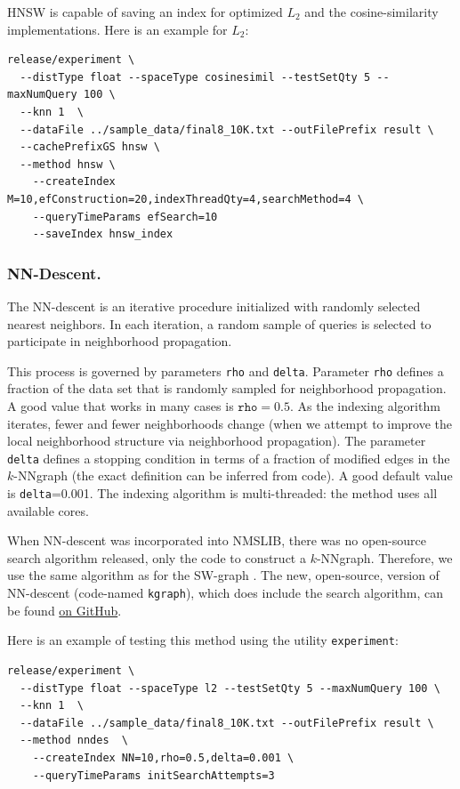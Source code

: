 \documentclass[runningheads,a4paper]{llncs}
\newcommand{\ttt}[1]{\texttt{#1}}
\newcommand{\knnns}{$k$-NN}
\begin{document}
HNSW is capable of saving an index for optimized $L_2$ and the cosine-similarity implementations. 
Here is an example for $L_2$:
{
\footnotesize
\begin{verbatim}
release/experiment \
  --distType float --spaceType cosinesimil --testSetQty 5 --maxNumQuery 100 \
  --knn 1  \
  --dataFile ../sample_data/final8_10K.txt --outFilePrefix result \
  --cachePrefixGS hnsw \
  --method hnsw \
    --createIndex M=10,efConstruction=20,indexThreadQty=4,searchMethod=4 \
    --queryTimeParams efSearch=10 
    --saveIndex hnsw_index
\end{verbatim}
}

\subsubsection{NN-Descent.} \label{SectionNNDescent}
The NN-descent is an iterative procedure initialized with randomly selected
nearest neighbors. In each iteration, a random sample of queries is selected
to participate in neighborhood propagation.

This process is governed by parameters \ttt{rho} and \ttt{delta}. 
Parameter \ttt{rho} defines a fraction of the data set that is randomly
sampled for neighborhood propagation. A good value that works
in many cases is $\ttt{rho}=0.5$. As the indexing algorithm iterates,
fewer and fewer neighborhoods change (when we attempt to improve the local
neighborhood structure via neighborhood propagation). 
The parameter \ttt{delta} defines a stopping condition in terms of a fraction
of modified edges in the \knnns graph (the exact definition can be inferred from code). 
A good default value is \ttt{delta}=0.001.
The indexing algorithm is multi-threaded: the method uses all available cores.

When NN-descent was incorporated into NMSLIB, 
there was no open-source search algorithm released, only the code to construct a \knnns graph.
Therefore, we use the same algorithm as for the SW-graph \cite{malkov2012scalable,malkov2014}.
The new, open-source, version of NN-descent (code-named \ttt{kgraph}), 
which does include the search algorithm,
can be found \href{https://github.com/aaalgo/kgraph}{on GitHub}.

Here is an example of testing this method using the utility \ttt{experiment}:
{
\footnotesize
\begin{verbatim}
release/experiment \
  --distType float --spaceType l2 --testSetQty 5 --maxNumQuery 100 \
  --knn 1  \
  --dataFile ../sample_data/final8_10K.txt --outFilePrefix result \
  --method nndes  \
    --createIndex NN=10,rho=0.5,delta=0.001 \
    --queryTimeParams initSearchAttempts=3
\end{verbatim}
}
\end{document}
